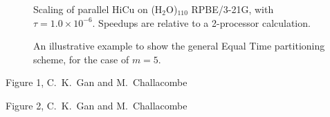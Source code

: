\commentoutA{\documentclass[prl,aps,twocolumn,showpacs,twocolumngrid,superbib]{revtex4}}
\begin{document}
{\begin{figure}[h]
\caption{Scaling of parallel HiCu on (H$_2$O)$_{110}$ RPBE/3-21G, with
$\tau = 1.0 \times 10^{-6}$. Speedups are relative to a 2-processor
calculation.}\label{fig:waterscaling}
\end{figure}

\begin{figure}[h]
\caption{An illustrative example to show the general Equal Time partitioning scheme, for the case of $m=5$.}\label{fig:binary}
\end{figure}

\pagebreak

\begin{center}
Figure 1, C.~K.~Gan and M.~Challacombe \\[1.cm]
\end{center}

\pagebreak
\begin{center}
Figure 2, C.~K.~Gan and M.~Challacombe \\[1.cm]
\end{center}

}
\end{document}
